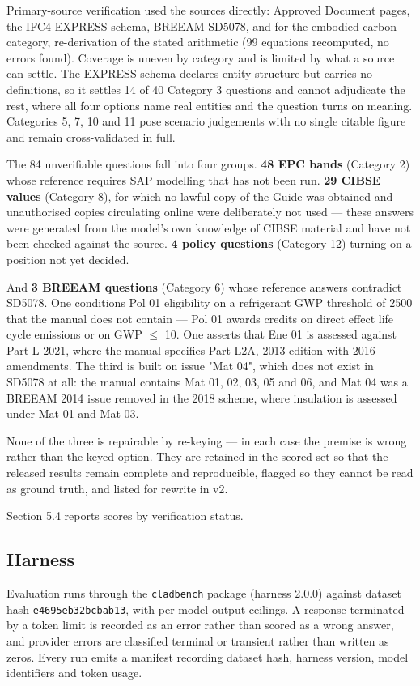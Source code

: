 \documentclass[11pt,a4paper]{article}
\begin{document}
Primary-source verification used the sources directly: Approved Document pages, the IFC4 EXPRESS schema, BREEAM SD5078, and for the embodied-carbon category, re-derivation of the stated arithmetic (99 equations recomputed, no errors found). Coverage is uneven by category and is limited by what a source can settle. The EXPRESS schema declares entity structure but carries no definitions, so it settles 14 of 40 Category 3 questions and cannot adjudicate the rest, where all four options name real entities and the question turns on meaning. Categories 5, 7, 10 and 11 pose scenario judgements with no single citable figure and remain cross-validated in full.

The 84 unverifiable questions fall into four groups. \textbf{48 EPC bands} (Category 2) whose reference requires SAP modelling that has not been run. \textbf{29 CIBSE values} (Category 8), for which no lawful copy of the Guide was obtained and unauthorised copies circulating online were deliberately not used --- these answers were generated from the model's own knowledge of CIBSE material and have not been checked against the source. \textbf{4 policy questions} (Category 12) turning on a position not yet decided.

And \textbf{3 BREEAM questions} (Category 6) whose reference answers contradict SD5078. One conditions Pol 01 eligibility on a refrigerant GWP threshold of 2500 that the manual does not contain --- Pol 01 awards credits on direct effect life cycle emissions or on GWP $\leq$ 10. One asserts that Ene 01 is assessed against Part L 2021, where the manual specifies Part L2A, 2013 edition with 2016 amendments. The third is built on issue "Mat 04", which does not exist in SD5078 at all: the manual contains Mat 01, 02, 03, 05 and 06, and Mat 04 was a BREEAM 2014 issue removed in the 2018 scheme, where insulation is assessed under Mat 01 and Mat 03.

None of the three is repairable by re-keying --- in each case the premise is wrong rather than the keyed option. They are retained in the scored set so that the released results remain complete and reproducible, flagged so they cannot be read as ground truth, and listed for rewrite in v2.

Section 5.4 reports scores by verification status.

\subsection{Harness}

Evaluation runs through the \texttt{cladbench} package (harness 2.0.0) against dataset hash \texttt{e4695eb32bcbab13}, with per-model output ceilings. A response terminated by a token limit is recorded as an error rather than scored as a wrong answer, and provider errors are classified terminal or transient rather than written as zeros. Every run emits a manifest recording dataset hash, harness version, model identifiers and token usage.
\end{document}
